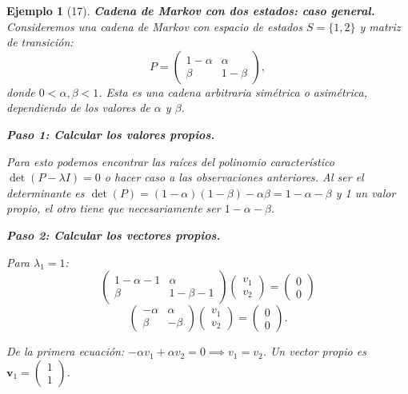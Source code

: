 \documentclass[12pt]{book}
\newtheorem{example}{Ejemplo}[chapter]
\begin{document}
\begin{example}[17]
\textbf{Cadena de Markov con dos estados: caso general.} Consideremos una cadena de Markov con espacio de estados $S = \{1, 2\}$ y matriz de transición:
\[
P = \begin{pmatrix}
1 - \alpha & \alpha \\
\beta & 1 - \beta
\end{pmatrix},
\]
donde $0 < \alpha, \beta < 1$. Esta es una cadena arbitraria simétrica o asimétrica, dependiendo de los valores de $\alpha$ y $\beta$.

\textbf{Paso 1: Calcular los valores propios.}

Para esto podemos encontrar las raíces del polinomio característico $\det(P - \lambda I) = 0$ o hacer caso a las observaciones anteriores. Al ser el determinante es $\det(P) = (1 - \alpha)(1 - \beta) - \alpha \beta = 1 - \alpha - \beta$ y 1 un valor propio, el otro tiene que necesariamente ser $1 - \alpha - \beta$.

\textbf{Paso 2: Calcular los vectores propios.}

Para $\lambda_1 = 1$:
\[
\begin{pmatrix}
1 - \alpha - 1 & \alpha \\
\beta & 1 - \beta - 1
\end{pmatrix} \begin{pmatrix} v_1 \\ v_2 \end{pmatrix} = \begin{pmatrix} 0 \\ 0 \end{pmatrix}
\]
\[
\begin{pmatrix}
-\alpha & \alpha \\
\beta & -\beta
\end{pmatrix} \begin{pmatrix} v_1 \\ v_2 \end{pmatrix} = \begin{pmatrix} 0 \\ 0 \end{pmatrix}.
\]

De la primera ecuación: $-\alpha v_1 + \alpha v_2 = 0 \implies v_1 = v_2$. Un vector propio es $\mathbf{v}_1 = \begin{pmatrix} 1 \\ 1 \end{pmatrix}$.


\end{example}
\end{document}
